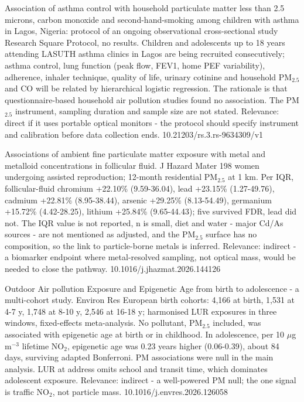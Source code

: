 \documentclass[10pt]{article}
\begin{document}
{Association of asthma control with household particulate matter less than 2.5 microns, carbon monoxide and second-hand-smoking among children with asthma in Lagos, Nigeria: protocol of an ongoing observational cross-sectional study}
{Research Square}
{Protocol, no results. Children and adolescents up to 18 years attending LASUTH asthma clinics in Lagos are being recruited consecutively; asthma control, lung function (peak flow, FEV1, home PEF variability), adherence, inhaler technique, quality of life, urinary cotinine and household PM$_{2.5}$ and CO will be related by hierarchical logistic regression. The rationale is that questionnaire-based household air pollution studies found no association. The PM$_{2.5}$ instrument, sampling duration and sample size are not stated. Relevance: direct if it uses portable optical monitors - the protocol should specify instrument and calibration before data collection ends.}
{10.21203/rs.3.rs-9634309/v1}

\par{}\baselineskip{}\baselineskip
{}

{Associations of ambient fine particulate matter exposure with metal and metalloid concentrations in follicular fluid.}
{J Hazard Mater}
{198 women undergoing assisted reproduction; 12-month residential PM$_{2.5}$ at 1 km. Per IQR, follicular-fluid chromium +22.10\% (9.59-36.04), lead +23.15\% (1.27-49.76), cadmium +22.81\% (8.95-38.44), arsenic +29.25\% (8.13-54.49), germanium +15.72\% (4.42-28.25), lithium +25.84\% (9.65-44.43); five survived FDR, lead did not. The IQR value is not reported, n is small, diet and water - major Cd/As sources - are not mentioned as adjusted, and the PM$_{2.5}$ surface has no composition, so the link to particle-borne metals is inferred. Relevance: indirect - a biomarker endpoint where metal-resolved sampling, not optical mass, would be needed to close the pathway.}
{10.1016/j.jhazmat.2026.144126}

{Outdoor Air pollution Exposure and Epigenetic Age from birth to adolescence - a multi-cohort study.}
{Environ Res}
{European birth cohorts: 4,166 at birth, 1,531 at 4-7 y, 1,748 at 8-10 y, 2,546 at 16-18 y; harmonised LUR exposures in three windows, fixed-effects meta-analysis. No pollutant, PM$_{2.5}$ included, was associated with epigenetic age at birth or in childhood. In adolescence, per 10 $\mu$g\,m$^{-3}$ lifetime NO$_2$, epigenetic age was 0.23 years higher (0.06-0.39), about 84 days, surviving adapted Bonferroni. PM associations were null in the main analysis. LUR at address omits school and transit time, which dominates adolescent exposure. Relevance: indirect - a well-powered PM null; the one signal is traffic NO$_2$, not particle mass.}
{10.1016/j.envres.2026.126058}
\end{document}
